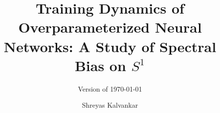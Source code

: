 \documentclass[twoside,a4paper,11pt]{memoir}
\title{Training Dynamics of Overparameterized Neural Networks: A Study of Spectral Bias on $S^1$}
\subtitle{Version of \today}
\author{Shreyas Kalvankar}                               %
\theoremstyle{plain}
\theoremstyle{definition}
\theoremstyle{remark}
\begin{document}
\frontmatter
\thispagestyle{empty}
\maketitle                                      %
\makeformaltitlepages{}         %



\cleardoublepage\tableofcontents
\cleardoublepage\listoffigures
\cleardoublepage\mainmatter







% 
% 




\appendix
\def\chaptername{Appendix}

% 
\end{document}
